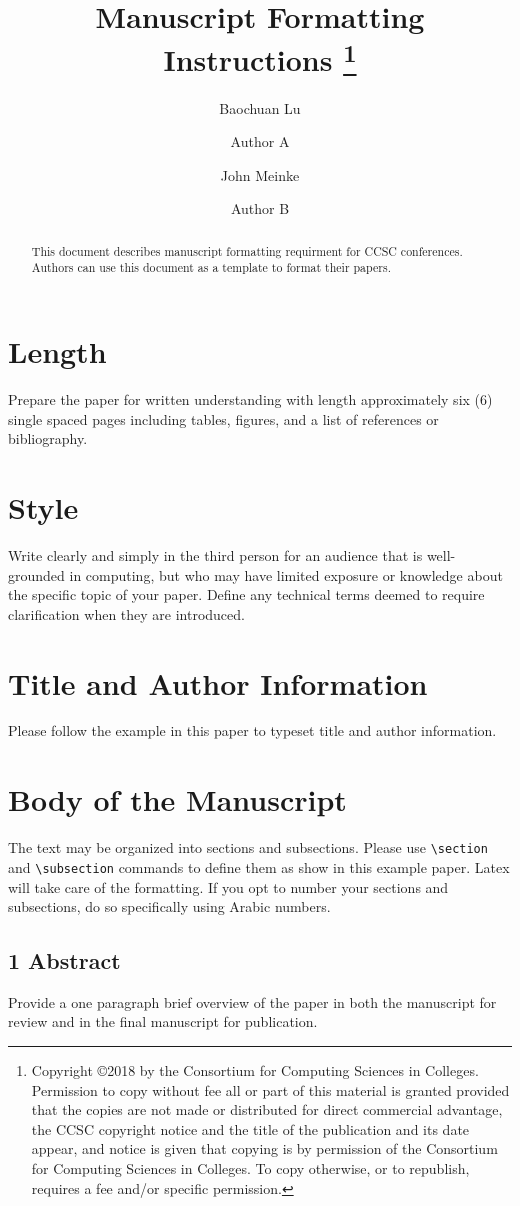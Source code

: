 \documentclass[letter,12pt]{article}
\title{Manuscript Formatting Instructions
\footnote{
Copyright \copyright 2018 by the Consortium for Computing Sciences in Colleges. Permission to copy without fee all or part of this material is granted provided that the copies are not made or distributed for direct commercial advantage, the CCSC copyright notice and the title of the publication and its date appear, and notice is given that copying is by permission of the Consortium for Computing Sciences in Colleges. To copy otherwise, or to republish, requires a fee and/or specific permission.}}
\date{\vspace{-7ex}}
\author[1]{Baochuan Lu}
\author[1]{Author A}
\author[2]{John Meinke}
\author[2]{Author B}
\affil[1]{\footnotesize
Computer and Information Sciences \protect\\
Southwest Baptist University \protect\\
Bolivar, MO 65613}
\affil[ ]{\textit {\{blue,auther\}@sbuniv.edu}}
\affil[2]{\footnotesize
Computer Science Department \protect\\
Excellent University \protect\\ Our Town, TX 00000}
\affil[ ]{\textit {\{email1,email2,email3,email4,email5\}@xyz.edu}}
\begin{document}
\maketitle

\begin{abstract}
This document describes manuscript formatting requirment for CCSC conferences. Authors can use this document as a template to format their papers.
\end{abstract}

\section*{Length}
Prepare the paper for written understanding with length approximately six (6) single spaced pages including tables, figures, and a list of references or bibliography.

\section*{Style}
Write clearly and simply in the third person for an audience that is well-grounded in computing, but who may have limited exposure or knowledge about the specific topic of your paper. Define any technical terms deemed to require clarification when they are introduced.

\section*{Title and Author Information}
Please follow the example in this paper to typeset title and author information.

\section*{Body of the Manuscript}
The text may be organized into sections and subsections. Please use \verb+\section+ and  \verb+\subsection+ commands to define them as show in this example paper. Latex will take care of the formatting. If you opt to number your sections and subsections, do so specifically using Arabic numbers.

\subsection*{1 Abstract}
Provide a one paragraph brief overview of the paper in both the manuscript for review and in the final manuscript for publication.
\end{document}
